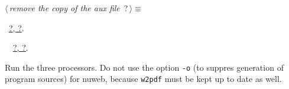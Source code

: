 \documentclass[twoside]{artikel3}
\renewcommand{\NWlink}[2]{\hyperlink{#1}{#2}}
\renewcommand{\NWtarget}[2]{\hypertarget{#1}{#2}}
\renewcommand{\NWsep}{$\diamond$\rule[-1\baselineskip]{0pt}{1\baselineskip}}
\renewcommand{\NWlink}[2]{\hyperlink{#1}{#2}}
\renewcommand{\NWtarget}[2]{\hypertarget{#1}{#2}}
\begin{document}
\begin{flushleft} \small
\begin{minipage}{\linewidth}\label{scrap25}\raggedright\small
\NWtarget{nuweb?}{} $\langle\,${\itshape remove the copy of the aux file}\nobreak\ {\footnotesize {?}}$\,\rangle\equiv$
\vspace{-1ex}
\vspace{-1.5ex}
\footnotesize
\begin{list}{}{\setlength{\itemsep}{-\parsep}\setlength{\itemindent}{-\leftmargin}}
\item \NWtxtMacroRefIn\ \NWlink{nuweb?}{?}\NWlink{nuweb?}{, ?}.
\item \NWtxtIdentsUsed\nobreak\  \verb@oldaux@\nobreak\ \NWlink{nuweb?}{?}\NWlink{nuweb?}{, ?}.
\item{}
\end{list}
\end{minipage}\vspace{4ex}
\end{flushleft}
Run the three processors. Do not use the option \verb|-o| (to suppres
generation of program sources) for nuweb,  because \verb|w2pdf| must
be kept up to date as well.
\end{document}
